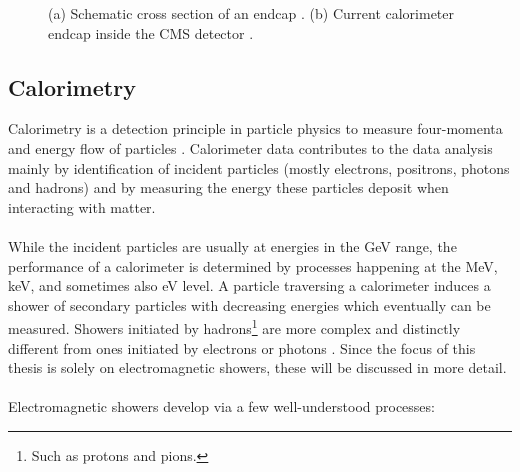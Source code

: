 \documentclass[../../main.tex]{subfiles}
\begin{document}
\begin{figure}[htp]
	\centering
	\hspace{1cm}
	\caption{(a) Schematic cross section of an endcap \cite{pp}. (b) Current calorimeter endcap inside the CMS detector \cite{cms_endcap}.}
\end{figure}

\subsection{Calorimetry}\label{sec:calo}
Calorimetry is a detection principle in particle physics to measure four-momenta and energy flow of particles \cite{wigmans08}. Calorimeter data contributes to the data analysis mainly by identification of incident particles (mostly electrons, positrons, photons and hadrons) and by measuring the energy these particles deposit when interacting with matter.\\
\\
While the incident particles are usually at energies in the GeV range, the performance of a calorimeter is determined by processes happening at the MeV, keV, and sometimes also eV level. A particle traversing a calorimeter induces a shower of secondary particles with decreasing energies which eventually can be measured. Showers initiated by hadrons\footnote{Such as protons and pions.} are more complex and distinctly different from ones initiated by electrons or photons \cite{wigmans08}. Since the focus of this thesis is solely on electromagnetic showers, these will be discussed in more detail.\\
\\
Electromagnetic showers develop via a few well-understood processes:
\end{document}
